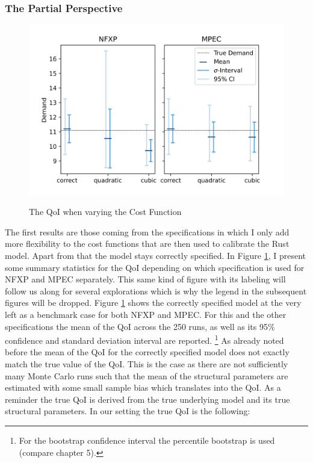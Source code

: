 \subsubsection{The Partial Perspective}

\begin{figure}[!b]
	\caption{The QoI when varying the Cost Function}
	\vspace*{-4mm}
	\centering
	\includegraphics[scale=0.9]{../figures/figure_5.png}
	\label{figure5}
\end{figure}

The first results are those coming from the specifications in which I only add more flexibility to the cost functions that are then used to calibrate the Rust model. Apart from that the model stays correctly specified. In Figure \ref{figure5}, I present some summary statistics for the QoI depending on which specification is used for NFXP and MPEC separately. This same kind of figure with its labeling will follow us along for several explorations which is why the legend in the subsequent figures will be dropped. Figure \ref{figure5} shows the correctly specified model at the very left as a benchmark case for both NFXP and MPEC. For this and the other specifications the mean of the QoI across the 250 runs, as well as its 95\% confidence and standard deviation interval are reported. \footnote{For the bootstrap confidence interval the percentile bootstrap is used (compare \cite{Davison.1997} chapter 5).} As already noted before the mean of the QoI for the correctly specified model does not exactly match the true value of the QoI. This is the case as there are not sufficiently many Monte Carlo runs such that the mean of the structural parameters are estimated with some small sample bias which translates into the QoI. As a reminder the true QoI is derived from the true underlying model and its true structural parameters. In our setting the true QoI is the following:


